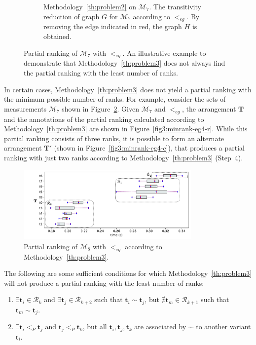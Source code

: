 \documentclass[acmsmall,screen, review]{acmart}
\begin{document}
\begin{figure}[h!]
\begin{subfigure}{0.45\textwidth}
		\caption{Methodology~\ref{th:problem2} on $\mathcal{M}_7$.  The transitivity reduction of graph $G$ for $\mathcal{M}_{7}$ according to $<_{eg}$. By removing the edge indicated in red, the graph $H$ is obtained.}
		\label{fig3:minrank-eg4-dfg}
	\end{subfigure}
	\caption{Partial ranking of $\mathcal{M}_{7}$ with $<_{eg}$. An illustrative example to demonstrate that Methodology~\ref{th:problem3} does not always find the partial ranking with the least number of ranks.  }
	\label{fig3:minrank-eg4}
\end{figure}

In certain cases, Methodology~\ref{th:problem3} does not yield a partial ranking with the minimum possible number of ranks. For example, consider the sets of measurements $\mathcal{M}_{7}$ shown in Figure~\ref{fig3:minrank-eg4}. Given $\mathcal{M}_{7}$ and $<_{eg}$, the arrangement $\mathbf{T}$ and the annotations of the partial ranking calculated according to Methodology~\ref{th:problem3} are shown in Figure~\ref{fig3:minrank-eg4-r}. While this partial ranking consists of three ranks, it is possible to form an alternate arrangement $\mathbf{T}'$ (shown in Figure~\ref{fig3:minrank-eg4-c}), that produces a partial ranking with just two ranks according to Methodology~\ref{th:problem3} (Step~4).
\begin{figure}[!h]
	\centering
	\includegraphics[width=0.8\textwidth]{fig/ch3/minrank-eg2-r}
	\caption{Partial ranking of $\mathcal{M}_8$ with $<_{eg}$ according to Methodology~\ref{th:problem3}.}
	\label{fig3:minrank-eg2-r}
\end{figure}

The following are some sufficient conditions for which Methodology~\ref{th:problem3} will not produce a partial ranking with the least number of ranks:
\begin{enumerate}
	\item $\exists \mathbf{t}_i \in \mathcal{R}_k$ and $\exists \mathbf{t}_j \in \mathcal{R}_{k+2}$ such that $\mathbf{t}_i \sim \mathbf{t}_j$, but $\nexists \mathbf{t}_m \in \mathcal{R}_{k+1}$ such that $\mathbf{t}_m \sim \mathbf{t}_j$.
	\item  $\exists \mathbf{t}_i <_{P} \mathbf{t}_j$ and $\mathbf{t}_j <_{P} \mathbf{t}_k$, but all $\mathbf{t}_i, \mathbf{t}_j, \mathbf{t}_k$ are associated by $\sim$ to another variant $\mathbf{t}_l$. 
\end{enumerate}
\end{document}
